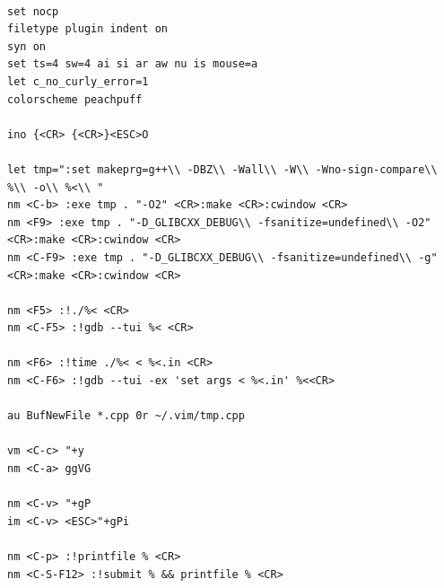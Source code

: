 \begin{verbatim}

set nocp
filetype plugin indent on
syn on
set ts=4 sw=4 ai si ar aw nu is mouse=a
let c_no_curly_error=1
colorscheme peachpuff

ino {<CR> {<CR>}<ESC>O

let tmp=":set makeprg=g++\\ -DBZ\\ -Wall\\ -W\\ -Wno-sign-compare\\ %\\ -o\\ %<\\ "
nm <C-b> :exe tmp . "-O2" <CR>:make <CR>:cwindow <CR>
nm <F9> :exe tmp . "-D_GLIBCXX_DEBUG\\ -fsanitize=undefined\\ -O2" <CR>:make <CR>:cwindow <CR>
nm <C-F9> :exe tmp . "-D_GLIBCXX_DEBUG\\ -fsanitize=undefined\\ -g" <CR>:make <CR>:cwindow <CR>

nm <F5> :!./%< <CR>
nm <C-F5> :!gdb --tui %< <CR>

nm <F6> :!time ./%< < %<.in <CR>
nm <C-F6> :!gdb --tui -ex 'set args < %<.in' %<<CR>

au BufNewFile *.cpp 0r ~/.vim/tmp.cpp

vm <C-c> "+y
nm <C-a> ggVG

nm <C-v> "+gP
im <C-v> <ESC>"+gPi

nm <C-p> :!printfile % <CR>
nm <C-S-F12> :!submit % && printfile % <CR>


\end{verbatim}
